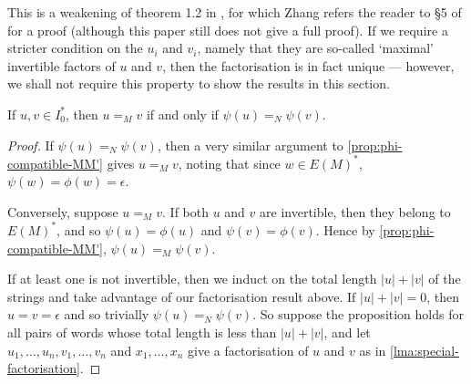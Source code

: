 \documentclass[noindex,noinsetproof,12pt]{lmaths}
\begin{document}
This is a weakening of theorem 1.2 in \cite{Zhang1992}, for which Zhang refers the reader to \S5 of \cite{Otto1991} for a proof (although this paper still does not give a full proof). If we require a stricter condition on the $u_i$ and $v_i$, namely that they are so-called `maximal' invertible factors of $u$ and $v$, then the factorisation is in fact unique --- however, we shall not require this property to show the results in this section.

\begin{prop}
	If $u, v \in I_0^*$, then $u =_M v$ if and only if $\psi(u) =_N \psi(v)$. \incomplete\label{prop:psi-MN-compatible}
\end{prop}
\begin{proof}
	If $\psi(u) =_N \psi(v)$, then a very similar argument to \cref{prop:phi-compatible-MM'} gives $u =_M v$, noting that since $w \in E(M)^*$, $\psi(w) = \phi(w) = \epsilon$.

	Conversely, suppose $u =_M v$. If both $u$ and $v$ are invertible, then they belong to $E(M)^*$, and so $\psi(u) = \phi(u)$ and $\psi(v) = \phi(v)$. Hence by \cref{prop:phi-compatible-MM'}, $\psi(u) =_M \psi(v)$.

	If at least one is not invertible, then we induct on the total length $|u| + |v|$ of the strings and take advantage of our factorisation result above. If $|u|+|v| = 0$, then $u = v = \epsilon$ and so trivially $\psi(u) =_N \psi(v)$. So suppose the proposition holds for all pairs of words whose total length is less than $|u| + |v|$, and let $u_1, \ldots, u_n, v_1, \ldots, v_n$ and $x_1, \ldots, x_n$ give a factorisation of $u$ and $v$ as in \cref{lma:special-factorisation}.


\end{proof}
\end{document}
